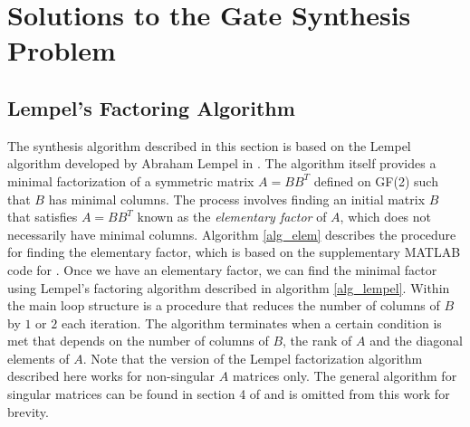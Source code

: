 \documentclass{article}
\theoremstyle{definition}
\theoremstyle{problem}
\theoremstyle{lemma}
\begin{document}
	
	
	\FloatBarrier
	\section{Solutions to the Gate Synthesis Problem}
	\label{s4_Solution}
		\FloatBarrier
		\subsection{Lempel's Factoring Algorithm}
		\label{s_Lempel}
		The synthesis algorithm described in this section is based on the Lempel algorithm developed by Abraham Lempel in \cite{36_Lempel_1975}. The algorithm itself provides a minimal factorization of a symmetric matrix $A=BB^T$ defined on GF(2) such that $B$ has minimal columns. The process involves finding an initial matrix $B$ that satisfies $A=BB^T$  known as the \emph{elementary factor} of $A$, which does not necessarily have minimal columns. Algorithm \ref{alg_elem} describes the procedure for finding the elementary factor, which is based on the supplementary MATLAB code for \cite{1_Campbell_2017}. Once we have an elementary factor, we can find the minimal factor using Lempel's factoring algorithm described in algorithm \ref{alg_lempel}. Within the main loop structure is a procedure that reduces the number of columns of $B$ by $1$ or $2$ each iteration. The algorithm terminates when a certain condition is met that depends on the number of columns of $B$, the rank of $A$ and the diagonal elements of $A$. Note that the version of the Lempel factorization algorithm described here works for non-singular $A$ matrices only. The general algorithm for singular matrices can be found in section 4 of \cite{36_Lempel_1975} and is omitted from this work for brevity.
		
\end{document}
